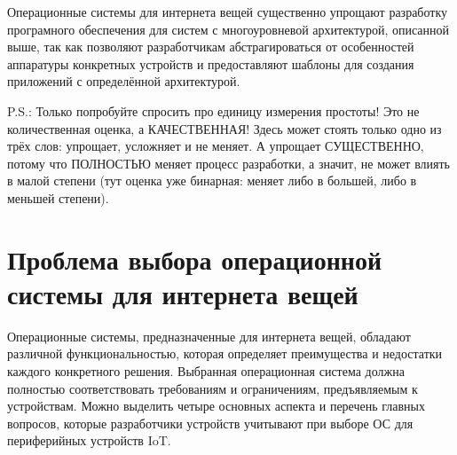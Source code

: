 Операционные системы для интернета вещей существенно упрощают разработку програмного обеспечения для систем с многоуровневой архитектурой, описанной выше, так как позволяют разработчикам абстрагироваться от особенностей аппаратуры конкретных устройств и предоставляют шаблоны для создания приложений с определённой архитектурой.

P.S.: Только попробуйте спросить про единицу измерения простоты! Это не количественная оценка, а КАЧЕСТВЕННАЯ! Здесь может стоять только одно из трёх слов: упрощает, усложняет и не меняет. А упрощает СУЩЕСТВЕННО, потому что ПОЛНОСТЬЮ меняет процесс разработки, а значит, не может влиять в малой степени (тут оценка уже бинарная: меняет либо в большей, либо в меньшей степени).








\section{Проблема выбора операционной системы для интернета вещей}

Операционные системы, предназначенные для интернета вещей, обладают различной функциональностью, которая определяет преимущества и недостатки каждого конкретного решения. Выбранная операционная система должна полностью соответствовать требованиям и ограничениям, предъявляемым к устройствам. Можно выделить четыре основных аспекта и перечень главных вопросов, которые разработчики устройств учитывают при выборе ОС для периферийных устройств IoT. \cite{OS_questions}

